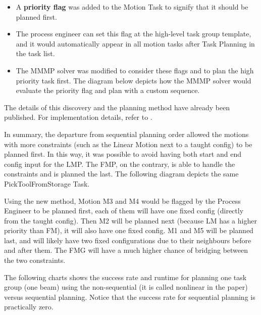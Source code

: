\begin{itemize}
	\item A \textbf{priority flag }was added to the Motion Task to signify that it should be planned first. 

	\item The process engineer can set this flag at the high-level task group template, and it would automatically appear in all motion tasks after Task Planning in the task list.

	\item The MMMP solver was modified to consider these flags and to plan the high priority task first. The diagram below depicts how the MMMP solver would evaluate the priority flag and plan with a custom sequence.

\end{itemize}
The details of this discovery and the planning method have already been published. For implementation details, refer to \parencite{huangNewAnalogProtocol2021}.




In summary, the departure from sequential planning order allowed the motions with more constraints (such as the Linear Motion next to a taught config) to be planned first. In this way, it was possible to avoid having both start and end config input for the LMP. The FMP, on the contrary, is able to handle the constraints and is planned the last. The following diagram depicts the same PickToolFromStorage Task. 

Using the new method, Motion M3 and M4 would be flagged by the Process Engineer to be planned first, each of them will have one fixed config (directly from the taught config). Then M2 will be planned next (because LM has a higher priority than FM), it will also have one fixed config. M1 and M5 will be planned last, and will likely have two fixed configurations due to their neighbours before and after them. The FMG will have a much higher chance of bridging between the two constraints. 




The following charts \parencite{huangNewAnalogProtocol2021} shows the success rate and runtime for planning one task group (one beam) using the non-sequential (it is called nonlinear in the paper) versus sequential planning. Notice that the success rate for sequential planning is practically zero. 




\vspace{1\baselineskip}
